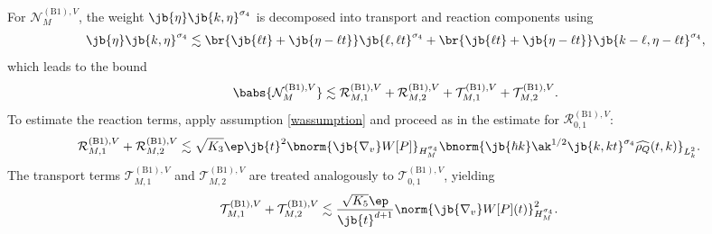 For $\mathcal{N}_M^{\mathrm{(B1)},V}$, the weight $\jb{\eta}\jb{k,\eta}^{\sigma_4}$ is decomposed into transport and reaction components using
\begin{align*}
\jb{\eta}\jb{k,\eta}^{\sigma_4}\lesssim\br{\vphantom{\jb{\cdot}_1^{\sigma}}\jb{\ell t}+\jb{\eta-\ell t}}\jb{\ell ,\ell t}^{\sigma_4}+\br{\vphantom{\jb{\cdot}_1^{\sigma}}\jb{\ell t}+\jb{\eta-\ell t}}\jb{k-\ell ,\eta-\ell t}^{\sigma_4},
\end{align*}
which leads to the bound \[\babs{\mathcal{N}_M^{\mathrm{(B1)},V}}\lesssim \mathcal{R}_{M,1}^{\mathrm{(B1)},V}+\mathcal{R}_{M,2}^{\mathrm{(B1)},V}+\mathcal{T}_{M,1}^{\mathrm{(B1)},V}+\mathcal{T}_{M,2}^{\mathrm{(B1)},V}.\] To estimate the reaction terms, apply assumption \eqref{wassumption} and proceed as in the estimate for $\mathcal{R}_{0,1}^{\mathrm{(B1)},V}$:
\begin{align*}
\mathcal{R}_{M,1}^{\mathrm{(B1)},V}+ \mathcal{R}_{M,2}^{\mathrm{(B1)},V}&\lesssim\sqrt{K_3}\ep\jb{t}^2\bnorm{\jb{\nabla_v}W[P]}_{H_M^{\sigma_4}}\bnorm{\jb{\hbar k}\ak^{1/2}\jb{k,kt}^{\sigma_4}\widehat{\rho_Q}(t,k)}_{L^2_k}.
\end{align*}
The transport terms $\mathcal{T}_{M,1}^{\mathrm{(B1)},V}$ and $\mathcal{T}_{M,2}^{\mathrm{(B1)},V}$ are treated analogously to $\mathcal{T}_{0,1}^{\mathrm{(B1)},V}$, yielding
\begin{align*}
\mathcal{T}_{M,1}^{\mathrm{(B1)},V}+\mathcal{T}_{M,2}^{\mathrm{(B1)},V}&\lesssim\frac{\sqrt{K_5}\ep}{\jb{t}^{d+1}}\norm{\jb{\nabla_v}W[P](t)}_{H^{\sigma_4}_M}^2.
\end{align*}

